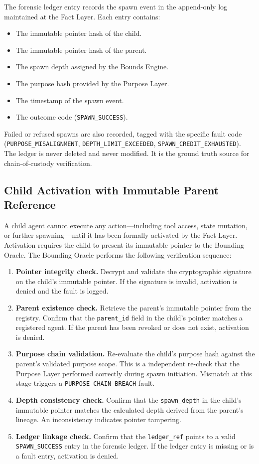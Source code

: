 The forensic ledger entry records the spawn event in the append-only log maintained at the Fact Layer. Each entry contains:

\begin{itemize}
    \item The immutable pointer hash of the child.
    \item The immutable pointer hash of the parent.
    \item The spawn depth assigned by the Bounds Engine.
    \item The purpose hash provided by the Purpose Layer.
    \item The timestamp of the spawn event.
    \item The outcome code (\texttt{SPAWN\_SUCCESS}).
\end{itemize}

Failed or refused spawns are also recorded, tagged with the specific fault code (\texttt{PURPOSE\_MISALIGNMENT}, \texttt{DEPTH\_LIMIT\_EXCEEDED}, \texttt{SPAWN\_CREDIT\_EXHAUSTED}). The ledger is never deleted and never modified. It is the ground truth source for chain-of-custody verification.

\subsection{Child Activation with Immutable Parent Reference}

A child agent cannot execute any action—including tool access, state mutation, or further spawning—until it has been formally activated by the Fact Layer. Activation requires the child to present its immutable pointer to the Bounding Oracle. The Bounding Oracle performs the following verification sequence:

\begin{enumerate}
    \item \textbf{Pointer integrity check.} Decrypt and validate the cryptographic signature on the child's immutable pointer. If the signature is invalid, activation is denied and the fault is logged.
    \item \textbf{Parent existence check.} Retrieve the parent's immutable pointer from the registry. Confirm that the \texttt{parent\_id} field in the child's pointer matches a registered agent. If the parent has been revoked or does not exist, activation is denied.
    \item \textbf{Purpose chain validation.} Re-evaluate the child's purpose hash against the parent's validated purpose scope. This is a independent re-check that the Purpose Layer performed correctly during spawn initiation. Mismatch at this stage triggers a \texttt{PURPOSE\_CHAIN\_BREACH} fault.
    \item \textbf{Depth consistency check.} Confirm that the \texttt{spawn\_depth} in the child's immutable pointer matches the calculated depth derived from the parent's lineage. An inconsistency indicates pointer tampering.
    \item \textbf{Ledger linkage check.} Confirm that the \texttt{ledger\_ref} points to a valid \texttt{SPAWN\_SUCCESS} entry in the forensic ledger. If the ledger entry is missing or is a fault entry, activation is denied.
\end{enumerate}

